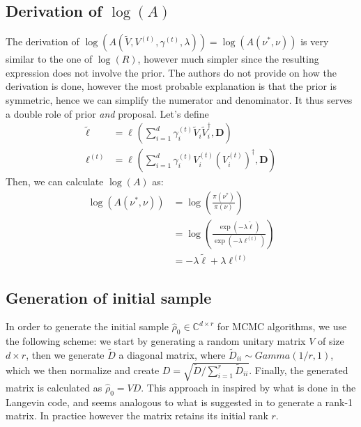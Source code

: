 \documentclass[12pt]{memoir}
\newcommand{\mb}{\mathbf}
\begin{document}
\subsection*{Derivation of $\log(A)$}
The derivation of $\log(A(\tilde V, V^{(t)}, \gamma^{(t)}, \lambda)) = \log(A(\nu^*, \nu))$ is very similar to the one of $\log(R)$, however much simpler since the resulting expression does not involve the prior. The authors do not provide on how the derivation is done, however the most probable explanation is that the prior is symmetric, hence we can simplify the numerator and denominator. It thus serves a double role of prior \textit{and} proposal. Let's define
\begin{align}
    \tilde \ell &= \ell^{}(\sum_{i=1}^{d} \gamma_i^{(t)} \tilde V_i \tilde V_i^\dagger, \mb D)\\
    \ell^{(t)} &= \ell^{}(\sum_{i=1}^{d} \gamma_i^{(t)} V_i^{(t)} (V_i^{(t)})^\dagger, \mb D)
\end{align}
Then, we can calculate $\log(A)$ as:
\begin{align}
    \log(A(\nu^*, \nu)) &= \log(\frac{\pi(\nu^*)} {\pi(\nu) })\\
                        &= \log(\frac{\exp(-\lambda \tilde \ell)}{\exp(-\lambda \ell^{(t)})})\\
                        &= -\lambda \tilde \ell + \lambda \ell^{(t)}
\end{align}

\subsection*{Generation of initial sample}\label{section:init-sample-gen}
In order to generate the initial sample $\hat \rho_0 \in \mathbb{C}^{d\times r}$ for MCMC algorithms, we use the following scheme: we start by generating a random unitary matrix $V$ of size $d \times r$, then we generate $\tilde D$ a diagonal matrix, where $\tilde D_{ii} \sim Gamma(1/r, 1)$, which we then normalize and create $D = \sqrt{\tilde D/\sum_{i=1}^{r} \tilde D_{ii}}$. Finally, the generated matrix is calculated as $\hat \rho_0 = V D$. This approach in inspired by what is done in the Langevin code, and seems analogous to what is suggested in \cite{MA17} to generate a rank-1 matrix. In practice however the matrix retains its initial rank $r$.

\end{document}
